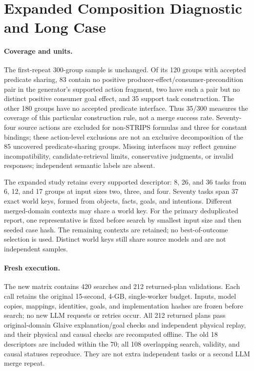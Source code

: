 \section{Expanded Composition Diagnostic and Long Case}
\label{sec:supp-expanded-composition}

\paragraph{Coverage and units.}
The first-repeat 300-group sample is unchanged. Of its 120 groups with accepted predicate sharing, 83 contain no positive producer-effect/consumer-precondition pair in the generator's supported action fragment, two have such a pair but no distinct positive consumer goal effect, and 35 support task construction. The other 180 groups have no accepted predicate interface. Thus 35/300 measures the coverage of this particular construction rule, not a merge success rate. Seventy-four source actions are excluded for non-STRIPS formulas and three for constant bindings; these action-level exclusions are not an exclusive decomposition of the 85 uncovered predicate-sharing groups. Missing interfaces may reflect genuine incompatibility, candidate-retrieval limits, conservative judgments, or invalid responses; independent semantic labels are absent.

The expanded study retains every supported descriptor: 8, 26, and 36 tasks from 6, 12, and 17 groups at input sizes two, three, and four. Seventy tasks span 37 exact world keys, formed from objects, facts, goals, and intentions. Different merged-domain contexts may share a world key. For the primary deduplicated report, one representative is fixed before search by smallest input size and then seeded case hash. The remaining contexts are retained; no best-of-outcome selection is used. Distinct world keys still share source models and are not independent samples.

\paragraph{Fresh execution.}
The new matrix contains 420 searches and 212 returned-plan validations. Each call retains the original 15-second, 4-GB, single-worker budget. Inputs, model copies, mappings, identities, goals, and implementation hashes are frozen before search; no new LLM requests or retries occur. All 212 returned plans pass original-domain Glaive explanation/goal checks and independent physical replay, and their physical and causal checks are recomputed offline. The old 18 descriptors are included within the 70; all 108 overlapping search, validity, and causal statuses reproduce. They are not extra independent tasks or a second LLM merge repeat.

